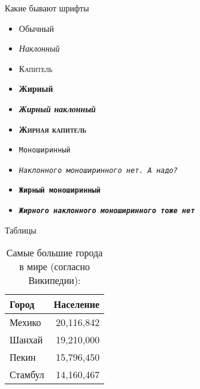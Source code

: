 \documentclass[12pt]{beamer}
\begin{document}
\begin{frame}{Какие бывают шрифты}
  \begin{itemize}
    \item Обычный
    \item \textit{Наклонный}
    \item \textsc{Капитель}
    \item \textbf{Жирный}
    \item \textbf{\textit{Жирный наклонный}}
    \item \textbf{\textsc{Жирная капитель}}
    \item \texttt{Моноширинный}
    \item \texttt{\textit{Наклонного моноширинного нет. А надо?}}
    \item \texttt{\textbf{Жирный моноширинный}}
    \item \texttt{\textbf{\textit{Жирного наклонного моноширинного тоже нет}}}
  \end{itemize}
\end{frame}

\begin{frame}{Таблицы}
  \begin{table}
    \caption{Самые большие города в мире (согласно Википедии):}
    \begin{tabular}{lr}
      \toprule
      Город & Население\\
      \midrule
      Мехико & 20,116,842\\
      Шанхай & 19,210,000\\
      Пекин & 15,796,450\\
      Стамбул & 14,160,467\\
      \bottomrule
    \end{tabular}
  \end{table}
\end{frame}
\end{document}
